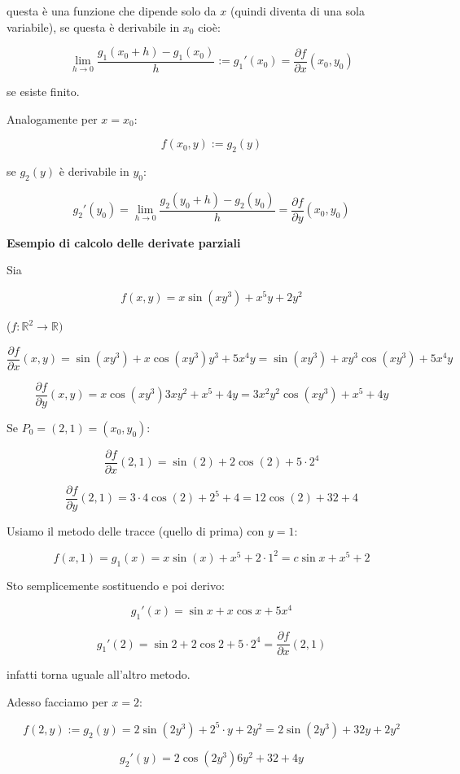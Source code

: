 \documentclass[11pt]{article}
\begin{document}
questa è una funzione che dipende solo da $x$ (quindi diventa di una sola variabile), se questa è derivabile in $x_0$ cioè:

\[
    \lim_{ h \to 0 } \frac{g_1(x_0+h)-g_1(x_0)}{h} := g_1'(x_0) = \frac{\partial f}{\partial x}(x_0,y_0)
\]

se esiste finito.

Analogamente per $x=x_0$:

\[
    f(x_0,y) := g_2(y)
\]

se $g_2(y)$ è derivabile in $y_0$:

\[
    g_2'(y_0)  = \lim_{ h \to 0 } \frac{g_2(y_0+h)-g_2(y_0)}{h} = \frac{\partial f}{\partial y}(x_0,y_0)
\]


\textbf{Esempio di calcolo delle derivate parziali} 

Sia 

\[
f(x,y) = x \sin(xy^{3})+x^{5}y+2y^{2} 
\]

($f: \mathbb{R}^{2}\rightarrow \mathbb{R})$


\[
    \frac{\partial f}{\partial x}(x,y) = \sin(xy^{3}) + x \cos(xy^{3}) y^{3}+5x^{4}y = \sin(xy^{3}) +xy^{3} \cos(xy^{3}) + 5x^{4}y
\]

\[
    \frac{\partial f}{\partial y}(x,y)  = x \cos(xy^{3}) 3xy^{2}+x^{5}+4y = 3 x^{2}y^{2} \cos(xy^{3}) + x^{5}+4y
\]

Se $P_0 = (2,1) = (x_0,y_0)$:

\[
    \frac{\partial f}{\partial x}(2,1) = \sin(2) + 2 \cos(2) + 5\cdot 2^{4} 
\]

\[
    \frac{\partial f}{\partial y}(2,1)  = 3\cdot 4 \cos(2) + 2^{5}+4 = 12 \cos(2) +32 + 4
\]

Usiamo il metodo delle tracce (quello di prima) con $y=1$:

\[
    f(x,1) = g_1(x)  = x \sin(x) + x^{5}+2 \cdot 1^{2} = c \sin x + x^{5}+2
\]

Sto semplicemente sostituendo e poi derivo:

\[
    g_1'(x) = \sin x+ x \cos x + 5x^{4}
\]

\[
    g_1'(2) = \sin 2 + 2 \cos 2 + 5 \cdot 2^{4} = \frac{\partial f}{\partial x}(2,1)
\]

infatti torna uguale all'altro metodo.

Adesso facciamo per $x=2$:

\[
    f(2,y) := g_2(y) = 2 \sin(2y^{3}) + 2^{5} \cdot y + 2y^{2} = 2 \sin(2y^{3}) + 32y + 2y^{2}
\]

\[
    g_2'(y) = 2 \cos(2y^{3}) 6y^{2} + 32 + 4y
\]
\end{document}
